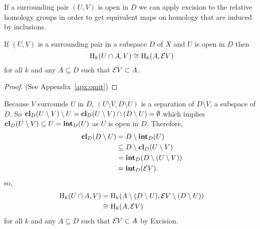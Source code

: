 If a surrounding pair $(U, V)$ is open in $D$ we can apply excision to the relative homology groups in order to get equivalent maps on homology that are induced by inclusions.

\begin{lemma}\label{lem:excision}
  If $(U, V)$ is a surrounding pair in a subspace $D$ of $X$ and $U$ is open in $D$ then
  \[ \mathrm{H}_k(U\cap A, V) \cong \mathrm{H}_k(A, \mathcal{E} V) \]
  for all $k$ and any $A\subseteq D$ such that $\mathcal{E} V\subset A$.
\end{lemma}
\begin{proof}
  (See Appendix~\ref{apx:omit})
\end{proof}
\proofatend
  Because $V$ surrounds $U$ in $D$, $(U\setminus V, D\setminus U)$ is a separation of $D\setminus V$, a subspace of $D$.
  So $\mathbf{cl}_D(U\setminus V)\setminus U = \mathbf{cl}_D(U\setminus V) \cap (D\setminus U) = \emptyset$ which implies $\mathbf{cl}_D(U\setminus V)\subseteq U = \mathbf{int}_D(U)$ as $U$ is open in $D$.
  Therefore,
  \begin{align*}
    \mathbf{cl}_D(D\setminus U) &= D\setminus \mathbf{int}_D(U)\\
                        &\subseteq D\setminus \mathbf{cl}_D(U\setminus V)\\
                        &= \mathbf{int}_D(D\setminus (U\setminus V))\\
                        &= \mathbf{int}_D(\mathcal{E} V).
  \end{align*}
  so,
  \begin{align*}
    \mathrm{H}_k(U\cap A, V) &= \mathrm{H}_k(A\setminus (D\setminus U), \mathcal{E} V\setminus (D\setminus U))\\
      &\cong \mathrm{H}_k(A, \mathcal{E} V)
  \end{align*}
  for all $k$ and any $A\subseteq D$ such that $\mathcal{E} V\subset A$ by Excision.
\endproofatend
